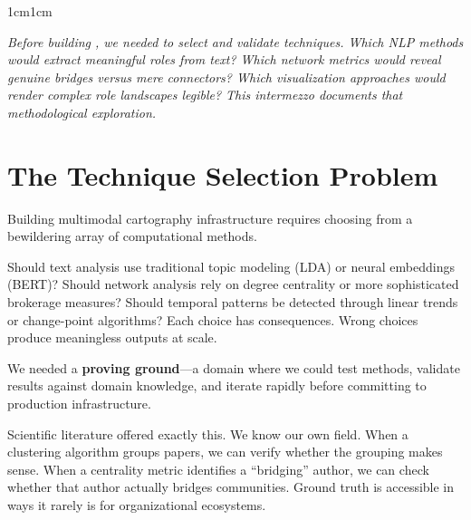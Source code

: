 \documentclass[../main.tex]{subfiles}
\begin{document}

\begin{center}
\end{center}

\vspace{1.5cm}

\begin{adjustwidth}{1cm}{1cm}

\noindent\textit{\large Before building \RoleBox{}, we needed to select and validate techniques. Which NLP methods would extract meaningful roles from text? Which network metrics would reveal genuine bridges versus mere connectors? Which visualization approaches would render complex role landscapes legible? This intermezzo documents that methodological exploration.}

\vspace{1.5cm}

\section*{The Technique Selection Problem}

Building multimodal cartography infrastructure requires choosing from a bewildering array of computational methods.


Should text analysis use traditional topic modeling (LDA) or neural embeddings (BERT)? Should network analysis rely on degree centrality or more sophisticated brokerage measures? Should temporal patterns be detected through linear trends or change-point algorithms? Each choice has consequences. Wrong choices produce meaningless outputs at scale.

We needed a \textbf{proving ground}---a domain where we could test methods, validate results against domain knowledge, and iterate rapidly before committing to production infrastructure.

Scientific literature offered exactly this. We know our own field. When a clustering algorithm groups papers, we can verify whether the grouping makes sense. When a centrality metric identifies a ``bridging'' author, we can check whether that author actually bridges communities. Ground truth is accessible in ways it rarely is for organizational ecosystems.


\end{adjustwidth}
\end{document}
